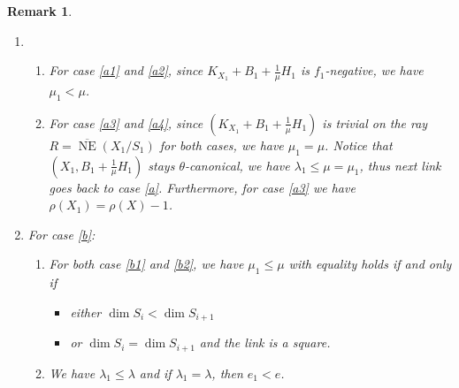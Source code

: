 \documentclass[11pt]{amsart}
\newtheorem{rmk}[defn]{Remark}
\begin{document}
\begin{rmk}
  
\begin{enumerate}
  \item 
  \begin{enumerate}
    \item For case \ref{a1} and \ref{a2},  since $ K_{X_1}+B_1+\frac{1}{\mu}H_1 $ is $ f_1 $-negative, we have    $\mu_1<\mu$.
    \item For case \ref{a3} and \ref{a4}, since $ (K_{X_1}+B_1+\frac{1}{\mu}H_1) $ is trivial on the ray $ R=\overline{\operatorname{NE}}(X_1/S_1) $ for both cases, we have $\mu_1=\mu$.
      Notice that $ (X_1,B_1+\frac{1}{\mu}H_1) $ stays $ \theta $-canonical, we have $\lambda_1\leqslant \mu=\mu_1$, thus next link goes back to case \ref{a}. Furthermore,   for case \ref{a3} we have $\rho(X_1)=\rho(X)-1$.
  \end{enumerate} 
\item For case \ref{b}: 
  \begin{enumerate}
    \item For both case \ref{b1} and \ref{b2}, we have   $\mu_1\leqslant \mu$
    with equality holds if and only if 
    \begin{itemize}
      \item 
        either $\dim S_i<\dim S_{i+1} $
        \item  
        or $\dim S_i=\dim S_{i+1}$ and the link is a square.
    \end{itemize}
  \item We have  $\lambda_1\leqslant \lambda$ and if $ \lambda_1=\lambda $, then   $e_1<e$.
  \end{enumerate} 
\end{enumerate}
\end{rmk}
\end{document}
